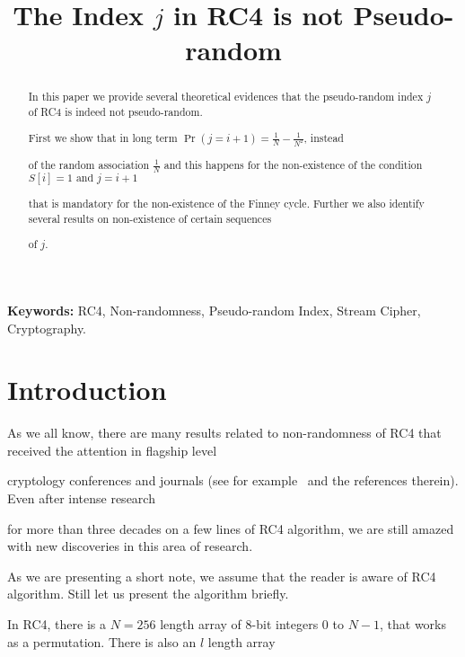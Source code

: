 \documentclass{llncs}
\begin{document}
\title{The Index $j$ in RC4 is not Pseudo-random}

\author{}

\institute{}

\maketitle



\begin{abstract}

In this paper we provide several theoretical evidences that the pseudo-random index $j$ of RC4 is indeed not pseudo-random. 

First we show that in long term $\Pr(j = i+1) = \frac{1}{N} - \frac{1}{N^2}$, instead 

of the random association $\frac{1}{N}$ and this happens for the non-existence of the condition $S[i] = 1 \mbox{ and } j = i+1$

that is mandatory for the non-existence of the Finney cycle. Further we also identify several results on non-existence of certain sequences 

of $j$. 

\end{abstract}

{\bf Keywords:} RC4, Non-randomness, Pseudo-random Index, Stream Cipher, Cryptography.



\section{Introduction}

As we all know, there are many results related to non-randomness of RC4 that received the attention in flagship level

cryptology conferences and journals (see for example~\cite{asia,joc,euro} and the references therein). Even after intense research 

for more than three decades on a few lines of RC4 algorithm, we are still amazed with new discoveries in this area of research. 

As we are presenting a short note, we assume that the reader is aware of RC4 algorithm. Still let us present the algorithm briefly.



In RC4, there is a $N = 256$ length array of 8-bit integers $0$ to $N-1$, that works as a permutation. There is also an $l$ length array
\end{document}
